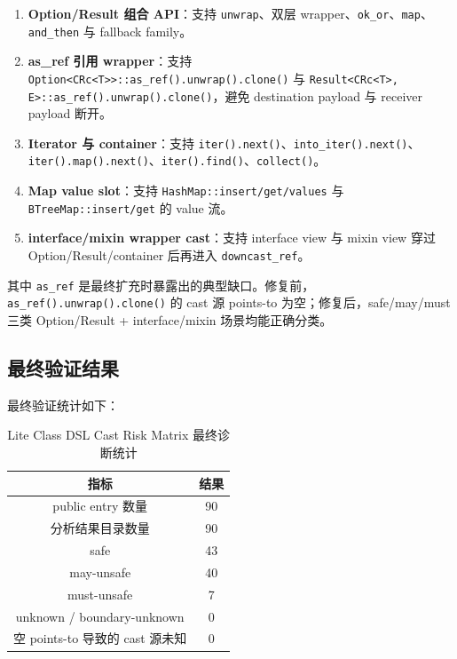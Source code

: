 \documentclass[10.5pt,compsoc,UTF8]{cjc}
\theoremstyle{mystyle}
\begin{document}
\begin{enumerate}
    \item \textbf{Option/Result 组合 API}：支持 \texttt{unwrap}、双层 wrapper、\texttt{ok\_or}、\texttt{map}、\texttt{and\_then} 与 fallback family。
    \item \textbf{as\_ref 引用 wrapper}：支持 \texttt{Option<CRc<T>>::as\_ref().unwrap().clone()} 与 \texttt{Result<CRc<T>, E>::as\_ref().unwrap().clone()}，避免 destination payload 与 receiver payload 断开。
    \item \textbf{Iterator 与 container}：支持 \texttt{iter().next()}、\texttt{into\_iter().next()}、\texttt{iter().map().next()}、\texttt{iter().find()}、\texttt{collect()}。
    \item \textbf{Map value slot}：支持 \texttt{HashMap::insert/get/values} 与 \texttt{BTreeMap::insert/get} 的 value 流。
    \item \textbf{interface/mixin wrapper cast}：支持 interface view 与 mixin view 穿过 Option/Result/container 后再进入 \texttt{downcast\_ref}。
\end{enumerate}

其中 \texttt{as\_ref} 是最终扩充时暴露出的典型缺口。修复前，\texttt{as\_ref().unwrap().clone()} 的 cast 源 points-to 为空；修复后，safe/may/must 三类 Option/Result + interface/mixin 场景均能正确分类。

\subsection{最终验证结果}

最终验证统计如下：

\begin{table}[H]
\centering
\begin{tabular}{|c|c|}
\hline
\textbf{指标} & \textbf{结果} \\ \hline
public entry 数量 & 90 \\ \hline
分析结果目录数量 & 90 \\ \hline
safe & 43 \\ \hline
may-unsafe & 40 \\ \hline
must-unsafe & 7 \\ \hline
unknown / boundary-unknown & 0 \\ \hline
空 points-to 导致的 cast 源未知 & 0 \\ \hline
\end{tabular}
\caption{Lite Class DSL Cast Risk Matrix 最终诊断统计}
\label{tab:lite_cast_risk_matrix_final_stats}
\end{table}
\end{document}
